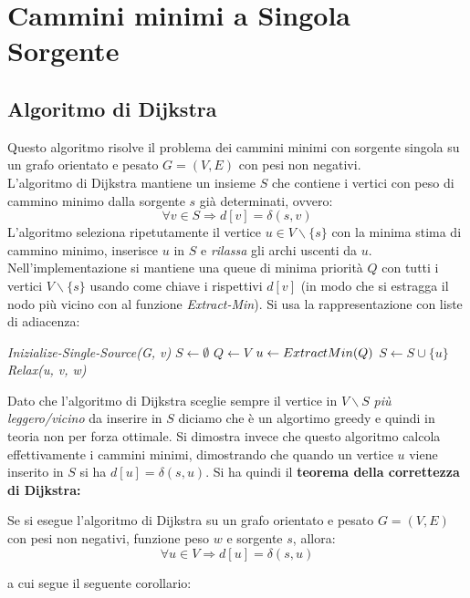 \documentclass[a4paper,12pt, oneside]{book}
\begin{document}
\section{Cammini minimi a Singola Sorgente}
\subsection{Algoritmo di Dijkstra}
Questo algoritmo risolve il problema dei cammini minimi con sorgente
singola su un grafo orientato e pesato $G=(V,E)$ con pesi non
negativi.\\
L'algoritmo di Dijkstra mantiene un insieme $S$ che contiene i vertici
con peso di cammino minimo dalla sorgente $s$ già determinati, ovvero:
\[\forall v\in S \Longrightarrow d[v]=\delta(s,v)\]
L'algoritmo seleziona ripetutamente il vertice $u\in V\backslash\{s\}$
con la minima stima di cammino minimo, inserisce $u$ in $S$ e
\textit{rilassa} gli archi uscenti da $u$. Nell'implementazione si
mantiene una queue di minima priorità $Q$ con tutti i vertici $ V\backslash\{s\}$ usando
come chiave i rispettivi $d[v]$ (in modo che si estragga il nodo più
vicino con al funzione \textit{Extract-Min}). Si usa la
rappresentazione con liste di adiacenza:
\begin{algorithm}[H]
  \begin{algorithmic}
    \State \textit{Inizialize-Single-Source(G, v)}
    \State $S\gets \emptyset$
    \State $Q\gets V$
    \State $u\gets Extract\-Min(Q)$
    \State $S\gets S\cup \{u\}$
    \State \textit{Relax(u, v, w)}
    \EndFor
    \EndWhile
    \EndFunction
  \end{algorithmic}
\end{algorithm}
Dato che l'algoritmo di Dijkstra sceglie sempre il vertice in
$V\backslash S$ \textit{più leggero/vicino} da inserire in $S$ diciamo
che è un algortimo greedy e quindi in teoria non per forza
ottimale. Si dimostra invece che questo algoritmo calcola
effettivamente i cammini minimi, dimostrando che quando un vertice $u$
viene inserito in $S$ si ha $d[u]=\delta(s,u)$. Si ha quindi il
\textbf{teorema della correttezza di Dijkstra:}
\begin{teorema}
  Se si esegue l'algoritmo di Dijkstra su un grafo orientato e pesato
  $G=(V,E)$ con pesi non negativi, funzione peso $w$ e sorgente $s$,
  allora:
  \[\forall u \in V \Longrightarrow d[u]=\delta(s,u)\]
\end{teorema}
a cui segue il seguente corollario:
\end{document}

